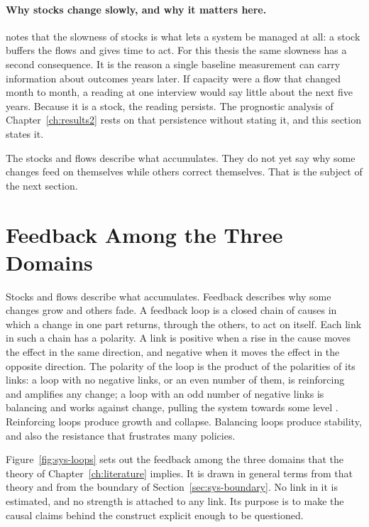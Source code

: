 \paragraph{Why stocks change slowly, and why it matters here.}
\citet{meadows_2008} notes that the slowness of stocks is what lets a system
be managed at all: a stock buffers the flows and gives time to act. For this
thesis the same slowness has a second consequence. It is the reason a single
baseline measurement can carry information about outcomes years later. If
capacity were a flow that changed month to month, a reading at one interview
would say little about the next five years. Because it is a stock, the reading
persists. The prognostic analysis of Chapter~\ref{ch:results2} rests on that
persistence without stating it, and this section states it.

The stocks and flows describe what accumulates. They do not yet say why some
changes feed on themselves while others correct themselves. That is the
subject of the next section.

\section{Feedback Among the Three Domains}
\label{sec:sys-loops}

Stocks and flows describe what accumulates. Feedback describes why some
changes grow and others fade. A feedback loop is a closed chain of causes in
which a change in one part returns, through the others, to act on itself.
Each link in such a chain has a polarity. A link is positive when a rise in
the cause moves the effect in the same direction, and negative when it moves
the effect in the opposite direction. The polarity of the loop is the product
of the polarities of its links: a loop with no negative links, or an even
number of them, is reinforcing and amplifies any change; a loop with an odd
number of negative links is balancing and works against change, pulling the
system towards some level \citep{sterman_2000,meadows_2008}. Reinforcing loops
produce growth and collapse. Balancing loops produce stability, and also the
resistance that frustrates many policies.

Figure~\ref{fig:sys-loops} sets out the feedback among the three domains that
the theory of Chapter~\ref{ch:literature} implies. It is drawn in general terms
from that theory and from the boundary of
Section~\ref{sec:sys-boundary}. No link in it is estimated, and no strength is
attached to any link. Its purpose is to make the causal claims behind the
construct explicit enough to be questioned.

